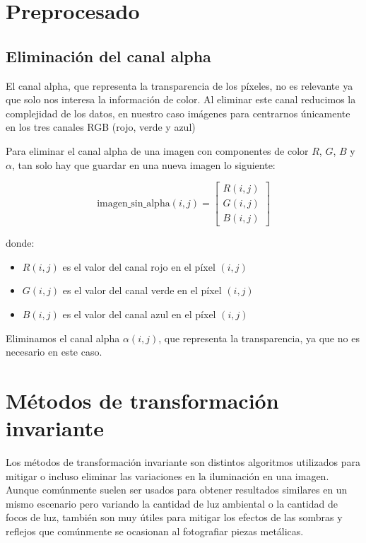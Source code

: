 

\section{Preprocesado}\label{preprocesado}


\subsection{Eliminación del canal alpha}\label{eliminación-del-canal-alpha}

El canal alpha, que representa la transparencia de los píxeles, no es relevante ya que solo nos interesa la información de color. Al eliminar este canal reducimos la complejidad de los datos, en nuestro caso imágenes para centrarnos únicamente en los tres canales RGB (rojo, verde y azul)

Para eliminar el canal alpha de una imagen con componentes de color $R$, $G$, $B$ y $\alpha$, tan solo hay que guardar en una nueva imagen lo siguiente:

$$\text{imagen\_sin\_alpha}(i, j) = 
\begin{bmatrix} R(i, j) \\ G(i, j) \\ B(i, j)\end{bmatrix}$$

donde:

\begin{itemize}
  \item $R(i, j)$ es el valor del canal rojo en el píxel $(i, j)$
  \item $G(i, j)$ es el valor del canal verde en el píxel $(i, j)$
  \item $B(i, j)$ es el valor del canal azul en el píxel $(i, j)$
\end{itemize}

Eliminamos el canal alpha $\alpha(i, j)$, que representa la transparencia, ya que no es necesario en este caso.

\section{Métodos de transformación invariante}\label{metodos-de-transformación-invariante}

Los métodos de transformación invariante son distintos algoritmos utilizados para mitigar o incluso eliminar las variaciones en la iluminación en una imagen. Aunque comúnmente suelen ser usados para obtener resultados similares en un mismo escenario pero variando la cantidad de luz ambiental o la cantidad de focos de luz, también son muy útiles para mitigar los efectos de las sombras y reflejos que comúnmente se ocasionan al fotografiar piezas metálicas. 

